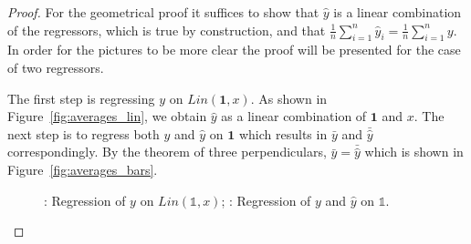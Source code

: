 \documentclass[nobib]{tufte-handout}
\begin{document}
\begin{proof}
For the geometrical proof it suffices to show that $\hat y$ is a linear combination of the regressors, which is true by construction,
and that $\frac{1}{n} \sum_{i=1}^{n} \hat y_i = \frac{1}{n} \sum_{i=1}^{n} y$. In order for the pictures to be more clear the proof will be presented for the case of two regressors.

The first step is regressing $y$ on $Lin(\mathbf{1}, x)$. As shown in Figure~\ref{fig:averages_lin}, we obtain $\hat y$ as a linear combination of $\mathbf{1}$ and $x$.
The next step is to regress both $y$ and $\hat y$ on $\mathbf{1}$ which results in $\bar y$ and $\bar \hat y$ correspondingly.
By the theorem of three perpendiculars, $\bar y = \bar \hat y$ which is shown in Figure~\ref{fig:averages_bars}.

\begin{figure}[ht!]
\begin{center}
\hspace{4ex}
\caption{: Regression of $y$ on $Lin(\mathbb{1},x)$; : Regression of $y$ and $\hat y$ on $\mathbb{1}$.}
\end{center}
\end{figure}



\end{proof}
\end{document}
